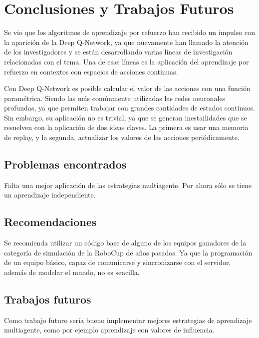 \chapter{Conclusiones y Trabajos Futuros}\label{chap:conclusiones}

Se vio que los algoritmos de aprendizaje por refuerzo han recibido un impulso con la aparición de la Deep Q-Network, ya que nuevamente han llamado la atención de los investigadores y se están desarrollando varias líneas de investigación relacionadas con el tema. Una de esas líneas es la aplicación del aprendizaje por refuerzo en contextos con espacios de acciones continuas.

Con Deep Q-Network es posible calcular el valor de las acciones con una función paramétrica. Siendo las más comúnmente utilizadas las redes neuronales profundas, ya que permiten trabajar con grandes cantidades de estados continuos. Sin embargo, su aplicación no es trivial, ya que se generan inestailidades que se resuelven con la aplicación de dos ideas claves. La primera es usar una memoria de replay, y la segunda, actualizar los valores de las acciones periódicamente.

\section{Problemas encontrados}
Falta una mejor aplicación de las estrategias multiagente. Por ahora sólo se tiene un aprendizaje independiente.

\section{Recomendaciones}
Se recomienda utilizar un código base de alguno de los equipos ganadores de la categoría de simulación de la RoboCup de años pasados. Ya que la programación de un equipo básico, capaz de comunicarse y sincronizarse con el servidor, además de modelar el mundo, no es sencilla.

\section{Trabajos futuros}
Como trabajo futuro sería bueno implementar mejores estrategias de aprendizaje multiagente, como por ejemplo aprendizaje con valores de influencia.